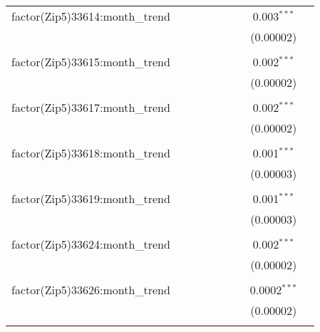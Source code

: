 \begin{table}[H]
{\begin{tabular}{@{\extracolsep{5pt}}lcccccccc}
  factor(Zip5)33614:month\_trend &  &  &  &  &  &  & 0.003$^{***}$ &  \\  

   &  &  &  &  &  &  & (0.00002) &  \\  

   & & & & & & & & \\  

  factor(Zip5)33615:month\_trend &  &  &  &  &  &  & 0.002$^{***}$ &  \\  

   &  &  &  &  &  &  & (0.00002) &  \\  

   & & & & & & & & \\  

  factor(Zip5)33617:month\_trend &  &  &  &  &  &  & 0.002$^{***}$ &  \\  

   &  &  &  &  &  &  & (0.00002) &  \\  

   & & & & & & & & \\  

  factor(Zip5)33618:month\_trend &  &  &  &  &  &  & 0.001$^{***}$ &  \\  

   &  &  &  &  &  &  & (0.00003) &  \\  

   & & & & & & & & \\  

  factor(Zip5)33619:month\_trend &  &  &  &  &  &  & 0.001$^{***}$ &  \\  

   &  &  &  &  &  &  & (0.00003) &  \\  

   & & & & & & & & \\  

  factor(Zip5)33624:month\_trend &  &  &  &  &  &  & 0.002$^{***}$ &  \\  

   &  &  &  &  &  &  & (0.00002) &  \\  

   & & & & & & & & \\  

  factor(Zip5)33626:month\_trend &  &  &  &  &  &  & 0.0002$^{***}$ &  \\  

   &  &  &  &  &  &  & (0.00002) &  \\  

   & & & & & & & & \\  


\end{tabular}}
\end{table}
